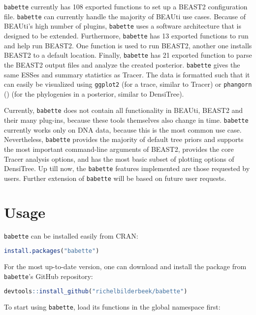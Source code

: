 \verb;babette; currently has 108 exported functions to set up  
a BEAST2 configuration file. 
\verb;babette; can currently handle the majority of BEAUti use cases.
Because of BEAUti's high number of plugins, 
\verb;babette; uses a software architecture that is designed to be extended.
Furthermore, \verb;babette; has 13 exported functions to run and help run BEAST2.
One function is used to run BEAST2, another
one installs BEAST2 to a default location.
Finally, \verb;babette; has 21 exported function to parse the BEAST2 output
files and analyze the created posterior. \verb;babette; gives the
same ESSes and summary statistics as Tracer. The data is formatted
such that it can easily be visualized using \verb;ggplot2; (for a trace,
similar to Tracer) or \verb;phangorn; (\cite{phangorn}) (for 
the phylogenies in a posterior, similar to DensiTree). 

Currently, \verb;babette; does not contain all functionality 
in BEAUti, BEAST2 and their many plug-ins, 
because these tools themselves also change in time.
\verb;babette; currently works only on DNA data,
because this is the most common use case. 
Nevertheless, \verb;babette; provides the majority of default tree priors and supports the most important command-line arguments of BEAST2, provides
the core Tracer analysis options, and has the most basic subset of 
plotting options of DensiTree. Up till now, the \verb;babette; features 
implemented are those requested by users. Further extension of \verb;babette; 
will be based on future user requests.

\section{Usage}

\verb;babette; can be installed easily from CRAN:

\begin{lstlisting}[language=R, floatplacement=H]
install.packages("babette")
\end{lstlisting}
For the most up-to-date version, 
one can download and install the package from \verb;babette;'s GitHub repository:

\begin{lstlisting}[language=R, floatplacement=H]
devtools::install_github("richelbilderbeek/babette")
\end{lstlisting}
To start using \verb;babette;, load its functions in the global namespace first:

